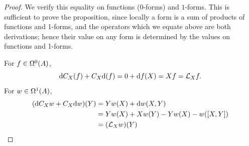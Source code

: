 \documentclass[../main]{subfiles}
\begin{document}
\begin{proof}
We verify this equality on functions ($0$-forms) and $1$-forms. This is sufficient to prove the proposition, since locally a form is a sum of products of functions and 1-forms, and the operators which we equate above are both derivations; hence their value on any form is determined by the values on functions and 1-forms.

For $f\in \formbundle{A}{0}$, \[\dd C_{X}(f)+C_{X} \dd(f)=0+\dd f(X)=X f=\liederiv{X} f.\] For $w\in \formbundle{A}{1}$, 
\begin{align*}
    (\dd C_{X}w+C_{X} \dd w)(Y)&=Y w(X)+\dd w(X, Y)\\&=Y w(X) + X w(Y)-Y w(X)-w([X, Y])\\&=(\liederiv{X} w)(Y)
\end{align*}

\end{proof}
\end{document}

